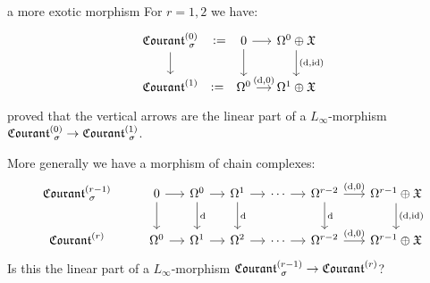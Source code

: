 \documentclass[beamer,10pt]{standalone}
\begin{document}





\begin{frame}{a more exotic morphism}
	For $r=1,2$ we have:
	\begin{displaymath}
		\begin{tikzcd}[ampersand replacement=\&,column sep = small]
			\Courant[\sigma]{0} \ar[r,phantom,":="] \ar[d]
			\&[1em]
			0 \ar[r] \ar[d]
			\& \Omega^0\oplus \X \ar[d,"{(\d,\id)}"]
			\\
			\Courant{1} \ar[r,phantom,":="] 
			\&
			\Omega^0 \ar[r,"{(\d,0)}"] 
			\& 
			\Omega^1\oplus \X
		\end{tikzcd}
	\end{displaymath}
	\cite{Zambon2012} proved that  the vertical arrows are the linear part of a $L_\infty$-morphism $\Courant[\sigma]{0} \to \Courant[\sigma]{1}$.
	\vfill

	More generally we have a morphism of chain complexes:
	\begin{displaymath}
		\begin{tikzcd}[ampersand replacement=\&,column sep = small]
			\Courant[\sigma]{r-1} %
			\&[1em]
			0 \ar[r] \ar[d]
			\& \Omega^0 \ar[d,"\d"] \ar[r]
			\& \Omega^1 \ar[d,"\d"] \ar[r]
			\& \cdots \ar[r]
			\& \Omega^{r-2} \ar[d,"\d"] \ar[r,"{(\d,0)}"]
			\&[.5em]  \Omega^{r-1} \oplus \X \ar[d,"{(\d,\id)}"]
			\\
			\Courant{r} %
			\& \Omega^0 \ar[r]
			\& \Omega^1 \ar[r]
			\& \Omega^2 \ar[r]
			\& \cdots \ar[r]
			\& \Omega^{r-2} \ar[r,"{(\d,0)}"]
			\&\Omega^{r-1} \oplus \X
		\end{tikzcd}
	\end{displaymath}
	Is this the linear part of a $L_\infty$-morphism $\Courant[\sigma]{r-1} \to \Courant{r}$?
	\vfill
\end{frame}
\end{document}
